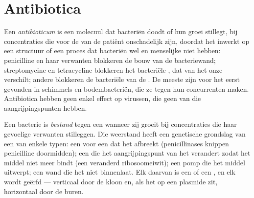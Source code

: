 \section{Antibiotica}

\begin{definition}[Antibioticum]\label{def:g11:antibiotic-resistance:antibiotic}
Een \emph{antibioticum} is een molecuul dat bacteriën
doodt of hun groei stillegt, bij concentraties die voor de  van de
patiënt onschadelijk zijn, doordat het inwerkt op een structuur of een
proces dat bacteriën wel en menselijke  niet hebben: penicilline en
haar verwanten blokkeren de bouw van de bacteriewand; streptomycine en
tetracycline blokkeren het bacteriële , dat van het onze
verschilt; andere blokkeren de bacteriële  van de .
De meeste zijn voor het eerst gevonden in schimmels en bodembacteriën,
die ze tegen hun concurrenten maken. Antibiotica hebben geen enkel effect
op virussen, die geen van die aangrijpingspunten hebben.
\end{definition}

\begin{proposition}\label{prop:g11:antibiotic-resistance:mechanisms}
Een bacterie is \emph{bestand} tegen een
 wanneer zij groeit bij concentraties die haar gevoelige
verwanten stilleggen. Die weerstand heeft een genetische grondslag van
een van enkele typen: een  voor een  dat het 
afbreekt (penicillinases knippen penicilline doormidden); een  die
het aangrijpingspunt van het  verandert zodat het middel niet
meer bindt (een veranderd ribosoomeiwit); een pomp die het middel
uitwerpt; een wand die het niet binnenlaat. Elk daarvan is een  of
een , en elk wordt geërfd --- verticaal door de kloon en, als het op
een plasmide zit, horizontaal door de buren.
\end{proposition}
\admitted

